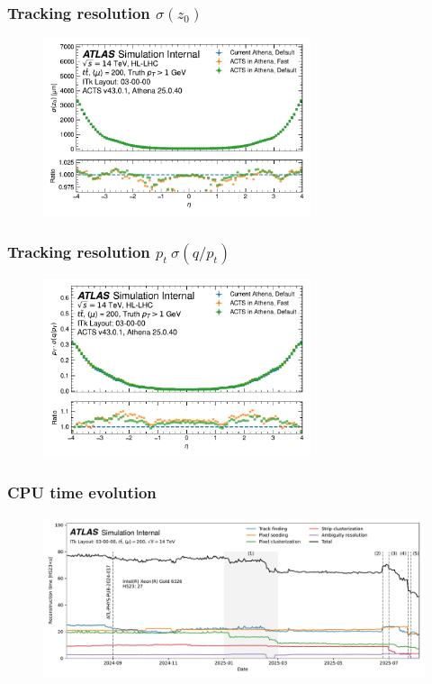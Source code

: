 \documentclass[aspectratio=169]{beamer}
\begin{document}
\begin{frame}
\frametitle{Tracking resolution $\sigma(z_0)$}
\begin{figure}[h]
    \centering
    \includegraphics[width=0.7\textwidth]{plots/tracking_resolution_z0.pdf}
    \caption{}
\end{figure}
\end{frame}

\begin{frame}
\frametitle{Tracking resolution $p_t \ \sigma(q/p_t)$}
\begin{figure}[h]
    \centering
    \includegraphics[width=0.7\textwidth]{plots/tracking_resolution_ptqopt.pdf}
    \caption{}
\end{figure}
\end{frame}

\begin{frame}
\frametitle{CPU time evolution}
\begin{figure}[h]
    \centering
    \includegraphics[width=1.0\textwidth]{plots/spot.pdf}
    \caption{}
\end{figure}
\end{frame}
\end{document}
